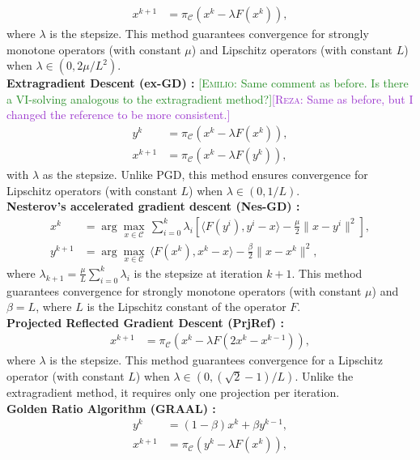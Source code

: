 \documentclass[letterpaper, 10 pt, conference]{ieeeconf}  %
\newcommand{\emiliosay}[1]{\textcolor{ForestGreen}{[\textsc{Emilio:} #1]}}
\newcommand{\rezasay}[1]{\textcolor{DarkOrchid}{[\textsc{Reza:} #1]}}
\begin{document}
\begin{align*}
    x^{k+1} &= \pi_{\mathcal{C}}(x^k - \lambda F(x^k)),
\end{align*}
where \(\lambda\) is the stepsize. This method guarantees convergence for strongly monotone operators (with constant \(\mu\)) and Lipschitz operators (with constant \(L\)) when \(\lambda \in (0, 2\mu/L^2)\).\\
\textbf{Extragradient Descent (ex-GD) \cite{malitsky2014extragradient}:} \emiliosay{Same comment as before. Is there a VI-solving analogous to the extragradient method?}\rezasay{Same as before, but I changed the reference to be more consistent.} 
\begin{align*}
    y^k &= \pi_{\mathcal{C}}(x^k - \lambda F(x^k)), \\
    x^{k+1} &= \pi_{\mathcal{C}}(x^k - \lambda F(y^k)),
\end{align*}
with \(\lambda\) as the stepsize. Unlike PGD, this method ensures convergence for Lipschitz operators (with constant \(L\)) when \(\lambda \in (0, 1/L)\). \\
\textbf{Nesterov's accelerated gradient descent (Nes-GD) \cite{nesterov2006solving}:}
\begin{align*}
    x^k &= \arg\max_{x \in \mathcal{C}} \, \sum_{i=0}^k \lambda_i \left[\langle F(y^i), y^i - x \rangle - \frac{\mu}{2} \|x - y^i\|^2\right], \\
    y^{k+1} &= \arg\max_{x \in \mathcal{C}} \, \langle F(x^k), x^k - x \rangle - \frac{\beta}{2} \|x - x^k\|^2,
\end{align*}
where \(\lambda_{k+1} = \frac{\mu}{L} \sum_{i=0}^k \lambda_i\) is the stepsize at iteration \(k+1\). This method guarantees convergence for strongly monotone operators (with constant \(\mu\)) and \(\beta = L\), where \(L\) is the Lipschitz constant of the operator \(F\).\\
\textbf{Projected Reflected Gradient Descent (PrjRef) \cite{malitsky2015projected}:}  
\begin{align*}
    x^{k+1} &= \pi_{\mathcal{C}}(x^k - \lambda F(2x^k - x^{k-1})),
\end{align*}
where \(\lambda\) is the stepsize. This method guarantees convergence for a Lipschitz operator (with constant \(L\)) when \(\lambda \in (0, (\sqrt{2}-1)/L)\). Unlike the extragradient method, it requires only one projection per iteration.\\
\textbf{Golden Ratio Algorithm (GRAAL) \cite{malitsky2020golden}:}  
\begin{align*}
    y^k &= (1-\beta)x^k + \beta y^{k-1}, \\
    x^{k+1} &= \pi_{\mathcal{C}}(y^k - \lambda F(x^k)),
\end{align*}
\end{document}
